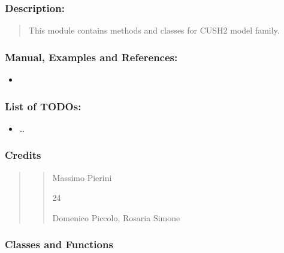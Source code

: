 \documentclass[letterpaper,10pt,english]{sphinxmanual}
\begin{document}
\subsubsection{Description:}
\label{\detokenize{cubmods:id48}}\begin{quote}

\sphinxAtStartPar
This module contains methods and classes
for CUSH2 model family.
\end{quote}


\subsubsection{Manual, Examples and References:}
\label{\detokenize{cubmods:id49}}\begin{itemize}
\item {} 
\sphinxAtStartPar
{}

\end{itemize}


\subsubsection{List of TODOs:}
\label{\detokenize{cubmods:id50}}\begin{itemize}
\item {} 
\sphinxAtStartPar
…

\end{itemize}


\subsubsection{Credits}
\label{\detokenize{cubmods:id51}}\begin{quote}
\begin{quote}\begin{description}
\sphinxAtStartPar
Massimo Pierini

\sphinxhyphen{}24

\sphinxAtStartPar
Domenico Piccolo, Rosaria Simone

\sphinxAtStartPar
{}

\end{description}\end{quote}
\end{quote}


\subsubsection{Classes and Functions}
\label{\detokenize{cubmods:id52}}
\end{document}
